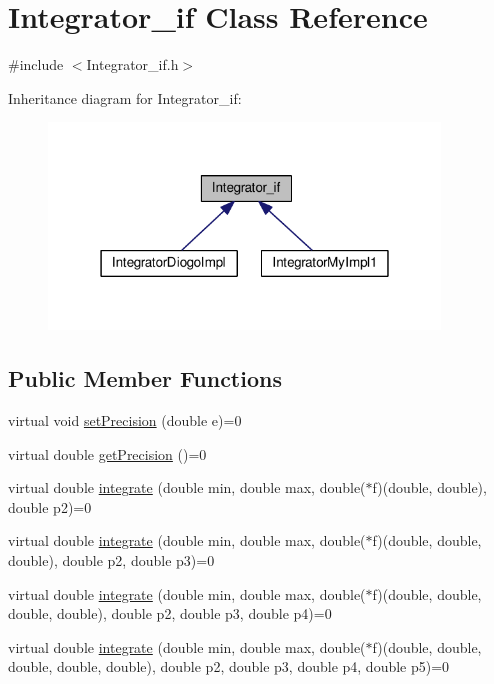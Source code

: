\hypertarget{class_integrator__if}{\section{Integrator\-\_\-if Class Reference}
\label{class_integrator__if}
}


{\ttfamily \#include $<$Integrator\-\_\-if.\-h$>$}



Inheritance diagram for Integrator\-\_\-if\-:\nopagebreak
\begin{figure}[H]
\begin{center}
\leavevmode
\includegraphics[width=295pt]{class_integrator__if__inherit__graph}
\end{center}
\end{figure}
\subsection*{Public Member Functions}
\begin{DoxyCompactItemize}
\item 
virtual void \hyperlink{class_integrator__if_a49c27818a4b0caf41c39d22a18b41337}{set\-Precision} (double e)=0
\item 
virtual double \hyperlink{class_integrator__if_af3ab4e8ffa96c8970b2e3c980f84e89d}{get\-Precision} ()=0
\item 
virtual double \hyperlink{class_integrator__if_a841c836fd72d4c428178d1e28a999ec9}{integrate} (double min, double max, double($\ast$f)(double, double), double p2)=0
\item 
virtual double \hyperlink{class_integrator__if_a193d992d6101517249d9bee153607aa6}{integrate} (double min, double max, double($\ast$f)(double, double, double), double p2, double p3)=0
\item 
virtual double \hyperlink{class_integrator__if_a306e4fcb840f789d7a918550fa20cc28}{integrate} (double min, double max, double($\ast$f)(double, double, double, double), double p2, double p3, double p4)=0
\item 
virtual double \hyperlink{class_integrator__if_abaeac01142a4da07ba0f07a52732ac79}{integrate} (double min, double max, double($\ast$f)(double, double, double, double, double), double p2, double p3, double p4, double p5)=0
\end{DoxyCompactItemize}


